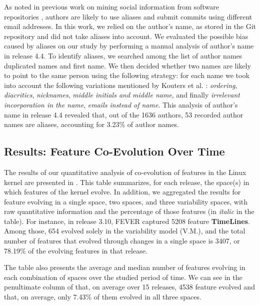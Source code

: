 As noted in previous work on mining social information from software repositories \citep{kouters_whos_2012,bird_latent_2008}, authors are likely to use aliases and submit commits using different email addresses.
In this work, we relied on the author's name, as stored in the Git repository and did not take aliases into account.
We evaluated the possible bias caused by aliases on our study by performing a manual analysis of author's name in release 4.4.
To identify aliases, we searched among the list of author names duplicated names and first name. We then
decided whether two names are likely to point to the same person using the following strategy: 
for each name we took into account the following variations mentioned by Kouters et al. \citep{kouters_whos_2012}:
\textit{ordering}, \textit{diacritics}, \textit{nicknames}, 
\textit{middle initials and middle name}, and finally \textit{irrelevant incorporation in the name}, \textit{emails instead of name}.
This analysis of author's name in release 4.4 revealed that, out of the 1636 authors, 53 recorded author names are aliases, 
accounting for 3.23\% of author names.

\subsection{Results: Feature Co-Evolution Over Time}

The results of our quantitative analysis of co-evolution of features in the Linux kernel are presented in .
This table summarizes, for each release, the space(s) in which features of the kernel evolve.
In addition, we aggregated the results for feature evolving in a single space, two spaces, and three variability spaces, 
with raw quantitative information and the percentage of those features (in \textit{italic} in the table).
For instance, in release 3.10, FEVER captured 5208 feature \textbf{TimeLines}.
Among those, 654 evolved solely in the variability model (V.M.), and the total number of features
that evolved through changes in a single space is 3407, or 78.19\% of the evolving features in that release.

The table also presents the average and median number of features evolving in each combination of spaces over the studied period of time.
We can see in the penultimate column of  that, on average over 15 releases,
4538 feature evolved and that, on average, only 7.43\% of them evolved in all three spaces.

